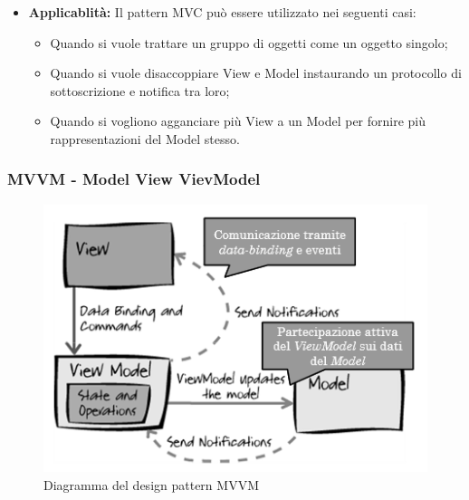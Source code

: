 \begin{itemize}
\item \textbf{Applicablità:} Il pattern MVC può essere utilizzato nei seguenti casi:

\begin{itemize}
\item Quando si vuole trattare un gruppo di oggetti come un oggetto singolo;
\item Quando si vuole disaccoppiare View e Model instaurando un protocollo di sottoscrizione e notifica tra loro;
\item Quando si vogliono agganciare più View a un Model per fornire più rappresentazioni del Model stesso.
\end{itemize}

\end{itemize}

\subsubsection{MVVM - Model View VievModel}

\begin{figure}[h]
\begin{center}
\includegraphics[scale=0.5]{img/MVVM.png}
\caption{Diagramma del design pattern MVVM}
\end{center}
\end{figure}

